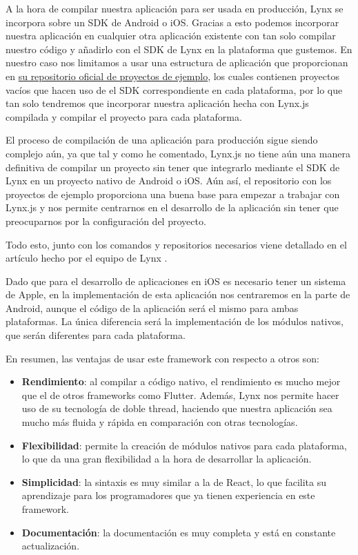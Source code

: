 A la hora de compilar nuestra aplicación para ser usada en producción, Lynx se incorpora sobre un SDK de Android o iOS. Gracias a esto podemos incorporar nuestra aplicación en cualquier otra aplicación existente con tan solo compilar nuestro código y añadirlo con el SDK de Lynx en la plataforma que gustemos.
En nuestro caso nos limitamos a usar una estructura de aplicación que proporcionan en \href{https://github.com/lynx-family/integrating-lynx-demo-projects}{su repositorio oficial de proyectos de ejemplo}, los cuales contienen proyectos vacíos que hacen uso de el SDK correspondiente en cada plataforma, por lo que tan solo tendremos que incorporar nuestra aplicación hecha con Lynx.js compilada y compilar el proyecto para cada plataforma.

El proceso de compilación de una aplicación para producción sigue siendo complejo aún, ya que tal y como he comentado, Lynx.js no tiene aún una manera definitiva de compilar un proyecto sin tener que integrarlo mediante el SDK de Lynx en un proyecto nativo de Android o iOS. Aún así, el repositorio con los proyectos de ejemplo proporciona una buena base para empezar a trabajar con Lynx.js y nos permite centrarnos en el desarrollo de la aplicación sin tener que preocuparnos por la configuración del proyecto.

Todo esto, junto con los comandos y repositorios necesarios viene detallado en el artículo hecho por el equipo de Lynx \parencite{lynx-native-modules}.

Dado que para el desarrollo de aplicaciones en iOS es necesario tener un sistema de Apple, en la implementación de esta aplicación nos centraremos en la parte de Android, aunque el código de la aplicación será el mismo para ambas plataformas.
La única diferencia será la implementación de los módulos nativos, que serán diferentes para cada plataforma.

En resumen, las ventajas de usar este framework con respecto a otros son:
\begin{itemize}
    \item \textbf{Rendimiento}: al compilar a código nativo, el rendimiento es mucho mejor que el de otros frameworks como Flutter. Además, Lynx nos permite hacer uso de su tecnología de doble thread, haciendo que nuestra aplicación sea mucho más fluida y rápida en comparación con otras tecnologías.
    \item \textbf{Flexibilidad}: permite la creación de módulos nativos para cada plataforma, lo que da una gran flexibilidad a la hora de desarrollar la aplicación.
    \item \textbf{Simplicidad}: la sintaxis es muy similar a la de React, lo que facilita su aprendizaje para los programadores que ya tienen experiencia en este framework.
    \item \textbf{Documentación}: la documentación es muy completa y está en constante actualización.
\end{itemize}

